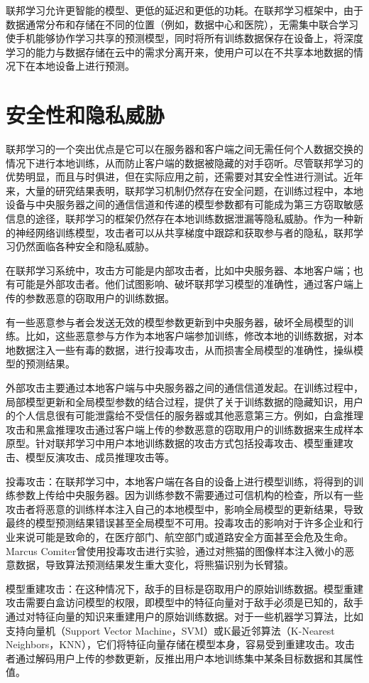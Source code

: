 联邦学习允许更智能的模型、更低的延迟和更低的功耗。在联邦学习框架中，由于数据通常分布和存储在不同的位置（例如，数据中心和医院），无需集中联合学习使手机能够协作学习共享的预测模型，同时将所有训练数据保存在设备上，将深度学习的能力与数据存储在云中的需求分离开来，使用户可以在不共享本地数据的情况下在本地设备上进行预测。

\section{安全性和隐私威胁}
联邦学习的一个突出优点是它可以在服务器和客户端之间无需任何个人数据交换的情况下进行本地训练，从而防止客户端的数据被隐藏的对手窃听。尽管联邦学习的优势明显，而且与时俱进，但在实际应用之前，还需要对其安全性进行测试。近年来，大量的研究结果表明，联邦学习机制仍然存在安全问题，在训练过程中，本地设备与中央服务器之间的通信信道和传递的模型参数都有可能成为第三方窃取敏感信息的途径，联邦学习的框架仍然存在本地训练数据泄漏等隐私威胁。作为一种新的神经网络训练模型，攻击者可以从共享梯度中跟踪和获取参与者的隐私，联邦学习仍然面临各种安全和隐私威胁。

在联邦学习系统中，攻击方可能是内部攻击者，比如中央服务器、本地客户端；也有可能是外部攻击者。他们试图影响、破坏联邦学习模型的准确性，通过客户端上传的参数恶意的窃取用户的训练数据。

有一些恶意参与者会发送无效的模型参数更新到中央服务器，破坏全局模型的训练。比如，这些恶意参与方作为本地客户端参加训练，修改本地的训练数据，对本地数据注入一些有毒的数据，进行投毒攻击，从而损害全局模型的准确性，操纵模型的预测结果。

外部攻击主要通过本地客户端与中央服务器之间的通信信道发起。在训练过程中，局部模型更新和全局模型参数的结合过程，提供了关于训练数据的隐藏知识，用户的个人信息很有可能泄露给不受信任的服务器或其他恶意第三方。例如，白盒推理攻击和黑盒推理攻击通过客户端上传的参数恶意的窃取用户的训练数据来生成样本原型。针对联邦学习中用户本地训练数据的攻击方式包括投毒攻击、模型重建攻击、模型反演攻击、成员推理攻击等。

投毒攻击：在联邦学习中，本地客户端在各自的设备上进行模型训练，将得到的训练参数上传给中央服务器。因为训练参数不需要通过可信机构的检查，所以有一些攻击者将恶意的训练样本注入自己的本地模型中，影响全局模型的更新结果，导致最终的模型预测结果错误甚至全局模型不可用。投毒攻击的影响对于许多企业和行业来说可能是致命的，在医疗部门、航空部门或道路安全方面甚至会危及生命。Marcus Comiter曾使用投毒攻击进行实验，通过对熊猫的图像样本注入微小的恶意数据，导致算法预测结果发生重大变化，将熊猫识别为长臂猿。

模型重建攻击：在这种情况下，敌手的目标是窃取用户的原始训练数据。模型重建攻击需要白盒访问模型的权限，即模型中的特征向量对于敌手必须是已知的，敌手通过对特征向量的知识来重建用户的原始训练数据。对于一些机器学习算法，比如支持向量机（Support Vector Machine，SVM）或K最近邻算法（K-Nearest Neighbors，KNN），它们将特征向量存储在模型本身，容易受到重建攻击。攻击者通过解码用户上传的参数更新，反推出用户本地训练集中某条目标数据和其属性值。

